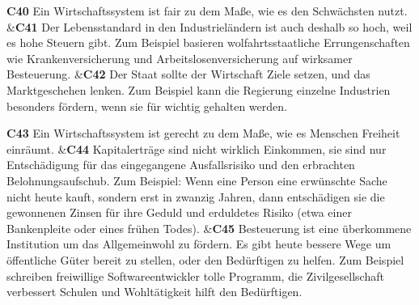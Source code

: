 \documentclass[
		11pt,
		a4paper,
		openright,
		oneside,
		ngerman
	]
	{book}
\begin{document}
\begin{longtabu}[htpb]
\textbf{C40}
		Ein Wirtschaftssystem ist fair zu dem Maße, wie es den Schwächsten nutzt.
&\textbf{C41} %
		Der Lebensstandard in den Industrieländern ist auch deshalb so hoch, weil es hohe Steuern gibt.
		Zum Beispiel basieren wolfahrtsstaatliche Errungenschaften wie Krankenversicherung und Arbeitslosenversicherung auf wirksamer Besteuerung.
&\textbf{C42}
		Der Staat sollte der Wirtschaft Ziele setzen, und das Marktgeschehen lenken.
		Zum Beispiel kann die Regierung einzelne Industrien besonders fördern, wenn sie für wichtig gehalten werden.
\\

\midrule

\textbf{C43}
		Ein Wirtschaftssystem ist gerecht zu dem Maße, wie es Menschen Freiheit einräumt.
&\textbf{C44} %
		Kapitalerträge sind nicht wirklich Einkommen, sie sind nur Entschädigung für das eingegangene Ausfallsrisiko und den erbrachten Belohnungsaufschub.
		Zum Beispiel: Wenn eine Person eine erwünschte Sache nicht heute kauft, sondern erst in zwanzig Jahren, dann entschädigen sie die gewonnenen Zinsen für ihre Geduld und erduldetes Risiko (etwa einer Bankenpleite oder eines frühen Todes).
&\textbf{C45} %
		Besteuerung ist eine überkommene Institution um das Allgemeinwohl zu fördern.
		Es gibt heute bessere Wege um öffentliche Güter bereit zu stellen, oder den Bedürftigen zu helfen.
		Zum Beispiel schreiben freiwillige Softwareentwickler tolle Programm, die Zivilgesellschaft verbessert Schulen und Wohltätigkeit hilft den Bedürftigen.
\\


\end{longtabu}
\end{document}
